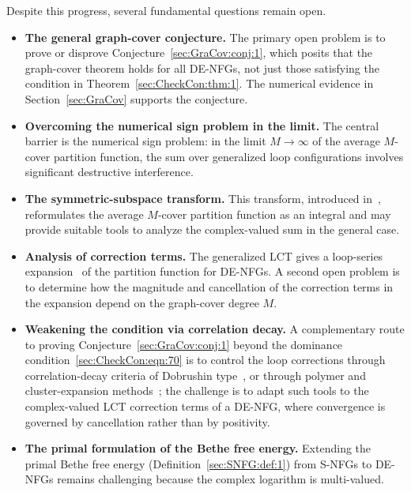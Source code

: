 \documentclass[journal]{IEEEtran}
\newcommand{\add}[1]{{\color{black}#1}}
\begin{document}
Despite this progress, several fundamental questions remain open.
\begin{itemize}
  \item \textbf{The general graph-cover conjecture.} The primary open problem is
        to prove or disprove Conjecture~\ref{sec:GraCov:conj:1}, which posits that
        the graph-cover theorem holds for all DE-NFGs, not just those satisfying the
        condition in Theorem~\ref{sec:CheckCon:thm:1}. The numerical evidence
        \add{in Section~\ref{sec:GraCov} supports the conjecture.}

  \item \textbf{Overcoming the numerical sign problem in the limit.} \add{The
          central barrier is the numerical sign problem: in the limit $M \to \infty$
          of the average $M$-cover partition function, the sum over generalized loop
          configurations involves significant destructive interference.}

  \item \add{\textbf{The symmetric-subspace transform.} This transform,
          introduced in~\cite[Chapter 5]{Huang2024}, reformulates the average
          $M$-cover partition function as an integral and may provide suitable tools
          to analyze the complex-valued sum in the general case.}

  \item \add{\textbf{Analysis of correction terms.} The generalized LCT gives a
          loop-series expansion~\cite{Chertkov2006,Chernyak2007} of the partition
          function for DE-NFGs. A second open problem is to determine how the
          magnitude and cancellation of the correction terms in the expansion depend
          on the graph-cover degree $M$.}

  \item \add{\textbf{Weakening the condition via correlation decay.} A
          complementary route to proving Conjecture~\ref{sec:GraCov:conj:1} beyond
          the dominance condition~\eqref{sec:CheckCon:eqn:70} is to control the loop
          corrections through correlation-decay criteria of Dobrushin
          type~\cite{Dobrushin1968}, or through polymer and cluster-expansion
          methods~\cite{Kotecky1986,Friedli2017}; the challenge is to adapt such
          tools to the complex-valued LCT correction terms of a DE-NFG, where
          convergence is governed by cancellation rather than by positivity.}

  \item \textbf{The primal formulation of the Bethe free energy.}
        \add{Extending} the primal Bethe free energy
        (Definition~\ref{sec:SNFG:def:1}) from S-NFGs to DE-NFGs remains challenging
        because the complex logarithm is multi-valued.
\end{itemize}
\end{document}
